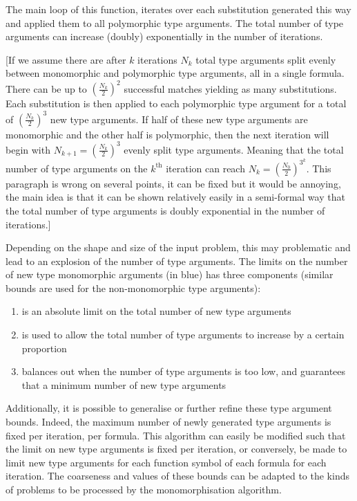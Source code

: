 \documentclass[]{ceurart}
\begin{document}
The main loop of this function, iterates over each substitution generated this way and applied them to all polymorphic type arguments. The total number of type arguments can increase (doubly) exponentially in the number of iterations.

[If we assume there are after \(k\) iterations \(N_k\) total type arguments split evenly between monomorphic and polymorphic type arguments, all in a single formula. There can be up to \((\frac{N_k}{2})^2\) successful matches yielding as many substitutions. Each substitution is then applied to each polymorphic type argument for a total of \((\frac{N_k}{2})^3\) new type arguments. If half of these new type arguments are monomorphic and the other half is polymorphic, then the next iteration will begin with \(N_{k+1} = (\frac{N_k}{2})^{3}\) evenly split type arguments. Meaning that the total number of type arguments on the \(k^\text{th}\) iteration can reach \(N_k = (\frac{N_0}{2})^{3^k}\). This paragraph is wrong on several points, it can be fixed but it would be annoying, the main idea is that it can be shown relatively easily in a semi-formal way that the total number of type arguments is doubly exponential in the number of iterations.]

Depending on the shape and size of the input problem, this may problematic and lead to an explosion of the number of type arguments. The limits on the number of new type monomorphic arguments (in \textcolor{ourblueviolet}{blue}) has three components (similar bounds are used for the non-monomorphic type arguments):
\begin{enumerate}
   \item \textcolor{ourblueviolet}{\MonoCap} is an absolute limit on the total number of new type arguments
   \item \textcolor{ourblueviolet}{\MonoMult} is used to allow the total number of type arguments to increase by a certain proportion
   \item \textcolor{ourblueviolet}{\MonoFloor} balances out \MonoMult when the number of type arguments is too low, and guarantees that a minimum number of new type arguments
\end{enumerate}

Additionally, it is possible to generalise or further refine these type argument bounds. Indeed, the maximum number of newly generated type arguments is fixed per iteration, per formula. This algorithm can easily be modified such that the limit on new type arguments is fixed per iteration, or conversely, be made to limit new type arguments for each function symbol of each formula for each iteration. The coarseness and values of these bounds can be adapted to the kinds of problems to be processed by the monomorphisation algorithm.
\end{document}
